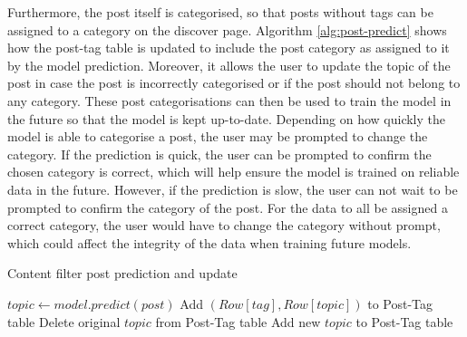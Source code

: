 Furthermore, the post itself is categorised, so that posts without tags can be assigned to a category on the discover page. Algorithm \ref{alg:post-predict} shows how the post-tag table is updated to include the post category as assigned to it by the model prediction. Moreover, it allows the user to update the topic of the post in case the post is incorrectly categorised or if the post should not belong to any category. These post categorisations can then be used to train the model in the future so that the model is kept up-to-date. Depending on how quickly the model is able to categorise a post, the user may be prompted to change the category. If the prediction is quick, the user can be prompted to confirm the chosen category is correct, which will help ensure the model is trained on reliable data in the future. However, if the prediction is slow, the user can not wait to be prompted to confirm the category of the post. For the data to all be assigned a correct category, the user would have to change the category without prompt, which could affect the integrity of the data when training future models.   

\begin{algorithm}
\caption{Content filter post prediction and update}
\label{alg:post-predict}
\begin{algorithmic}[1]
    \State $topic\gets model.predict(post)$
    \State Add $(Row[tag],Row[topic])$ to Post-Tag table
        Delete original $topic$ from Post-Tag table
        Add new $topic$ to Post-Tag table
    \EndIf
\EndFunction
\end{algorithmic}
\end{algorithm}